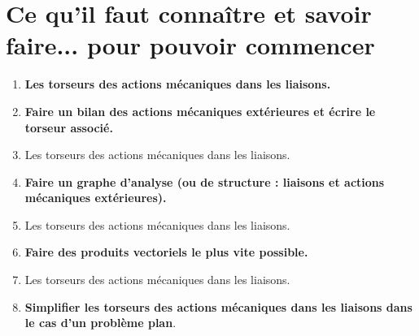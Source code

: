 \def\xxactivite{Cours}
\def\xxauteur{\textsl{Xavier Pessoles}}

\fichetrue
\proftrue
\tdfalse
\coursfalse

\def\xxnumpartie{Rév -- Stat}
\def\xxpartie{Principe fondamental de la statique (PFS)}
\def\xxnumchapitre{ Révisions 2\vspace{.2cm}}
\def\xxchapitre{\hspace{.12cm} Stratégie de résolution}

\def\xxpied{%
Révision statique -- Principe fondamental de la statique\\
Fiche 2 -- \xxactivite%
}


\def\xxcompetences{%
\textsl{%
\textbf{Savoirs et compétences :}\\
}}


\iflivret

\else

\fi
\setlength{\columnseprule}{.1pt}

\vspace{1cm}
\pagestyle{fancy}
\thispagestyle{plain}


\section{Ce qu'il faut connaître et savoir faire... pour pouvoir commencer}
\begin{enumerate}
\item \textbf{Les torseurs des actions mécaniques dans les liaisons.}
\item \textbf{Faire un bilan des actions mécaniques extérieures et écrire le torseur associé.}
\item Les torseurs des actions mécaniques dans les liaisons.
\item \textbf{Faire un graphe d'analyse (ou de structure : liaisons et actions mécaniques extérieures).}
\item Les torseurs des actions mécaniques dans les liaisons.
\item \textbf{Faire des produits vectoriels le plus vite possible.}
\item Les torseurs des actions mécaniques dans les liaisons.
\item \textbf{Simplifier les torseurs des actions mécaniques dans les liaisons dans le cas d'un problème plan}.
\end{enumerate}



